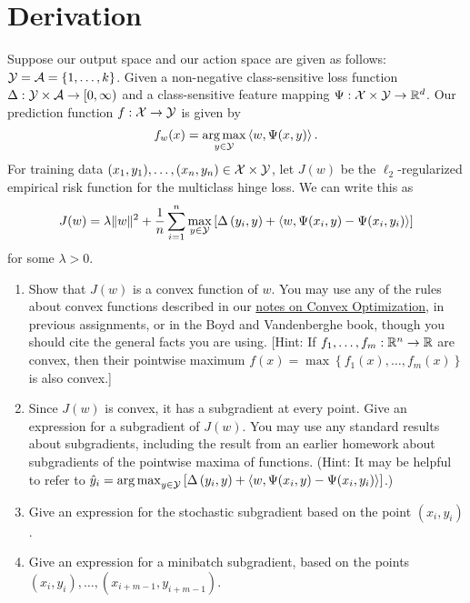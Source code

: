 \documentclass{article}
\theoremstyle{plain}
\theoremstyle{definition}
\begin{document}
\section{Derivation}
Suppose our output space and our action space are given as follows:
$\mathcal{Y}=\mathcal{A}=\left\{ 1,\ldots,k\right\} $. Given a non-negative class-sensitive
loss function $\Delta:\mathcal{Y}\times\mathcal{A}\to[0,\infty)$ and a class-sensitive
feature mapping $\Psi:\mathcal{X}\times\mathcal{Y}\to\mathbb{R}^{d}$. Our prediction
function $f:\mathcal{X}\to\mathcal{Y}$ is given by
\[
f_{w}(x)=\argmax_{y\in\cy}\left\langle w,\Psi(x,y)\right\rangle .
\]
For training data $(x_{1},y_{1}),\ldots,(x_{n},y_{n})\in\mathcal{X}\times\mathcal{Y}$,
let $J(w)$ be the $\ell_{2}$-regularized empirical risk function
for the multiclass hinge loss. We can write this as
\[
J(w)=\lambda\|w\|^{2}+\frac{1}{n}\sum_{i=1}^{n}\max_{y\in\mathcal{Y}}\left[\Delta\left(y_{i},y\right)+\left\langle w,\Psi(x_{i},y)-\Psi(x_{i},y_{i})\right\rangle \right]
\]
for some $\lambda>0$.
\begin{enumerate}
  \setcounter{enumi}{\value{saveenum}}
\item Show that $J(w)$ is a convex function of $w$. You
may use any of the rules about convex functions described in our \href{https://davidrosenberg.github.io/mlcourse/Notes/convex-optimization.pdf}{notes on Convex Optimization},
in previous assignments, or in the Boyd and Vandenberghe book, though
you should cite the general facts you are using. {[}Hint: If $f_{1},\ldots,f_{m}:\mathbb{R}^{n}\to\mathbb{R}$
are convex, then their pointwise maximum $f(x)=\max\left\{ f_{1}(x),\ldots,f_{m}(x)\right\} $
is also convex.{]}


\item Since $J(w)$ is convex, it has a subgradient at every point. Give
an expression for a subgradient of $J(w)$. You may use any standard
results about subgradients, including the result from an earlier homework
about subgradients of the pointwise maxima of functions. (Hint: It
may be helpful to refer to $\hat{y}_{i}=\argmax_{y\in\cy}\left[\Delta\left(y_{i},y\right)+\left\langle w,\Psi(x_{i},y)-\Psi(x_{i},y_{i})\right\rangle \right]$.)


\item Give an expression for the stochastic subgradient based on the point
$(x_{i},y_{i})$.


\item Give an expression for a minibatch subgradient, based on the points
$(x_{i},y_{i}),\ldots,\left(x_{i+m-1},y_{i+m-1}\right)$.


\setcounter{saveenum}{\value{enumi}}
\end{enumerate}
\end{document}
